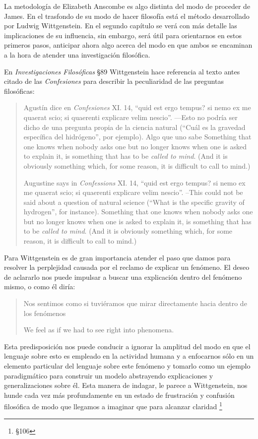 La metodología de Elizabeth Anscombe es algo distinta del modo de proceder de
James. En el trasfondo de su modo de hacer filosofía está el método desarrollado
por Ludwig Wittgenstein. En el segundo capítulo se verá con más detalle las
implicaciones de su influencia, sin embargo, será útil para orientarnos en estos
primeros pasos, anticipar ahora algo acerca del modo en que ambos se encaminan a
la hora de atender una investigación filosófica.

En \emph{Investigaciones Filosóficas} \S89 Wittgenstein hace referencia al texto
antes citado de las \emph{Confesiones} para describir la peculiaridad de las
preguntas filosóficas:

\blockquote[Augustine says in \emph{Confessions} XI. 14, ``quid est ergo tempus?
si nemo ex me quaerat scio; si quaerenti explicare velim nescio''. --This could
not be said about a question of natural science (``What is the specific gravity
of hydrogen'', for instance). Something that one knows when nobody asks one but
no longer knows when one is asked to explain it, is something that has to be
\emph{called to mind}. (And it is obviously something which, for some reason, it
is difficult to call to mind.)]{Agustín dice en \emph{Confesiones} XI. 14,
  \enquote{quid est ergo tempus? si nemo ex me quaerat scio; si quaerenti
    explicare velim nescio}. ---Esto no podría ser dicho de una pregunta propia
  de la ciencia natural (\enquote{Cuál es la gravedad específica del hidrógeno},
  por ejemplo).
Algo que uno sabe 
   Something that
  one knows when nobody asks one but no longer knows when one is asked to
  explain it, is something that has to be \emph{called to mind}. (And it is
  obviously something which, for some reason, it is difficult to call to mind.)}

Para Wittgenstein es de gran importancia atender el paso que damos para resolver
la perplejidad causada por el reclamo de explicar un fenómeno. El deseo de
aclararlo nos puede impulsar a buscar una explicación dentro del fenómeno mismo,
o como él diría:
\blockquote[We feel as if we had to see right into phenomena.
{\cite[\S90]{wittgenstein1953phiinv}}]{Nos sentimos como si tuviéramos que mirar
  directamente hacia dentro de los fenómenos}.
Esta predisposición nos
puede conducir a ignorar la amplitud del modo en que el lenguaje sobre esto es
empleado en la actividad humana y a enfocarnos sólo en un elemento particular
del lenguaje sobre este fenómeno y tomarlo como un ejemplo paradigmático para
construir un modelo abstrayendo explicaciones y generalizaciones sobre él. Esta
manera de indagar, le parece a Wittgenstein, nos hunde cada vez más
profundamente en un estado de frustración y confusión filosófica de modo que
llegamos a imaginar que para alcanzar claridad \footnote{\S106}

